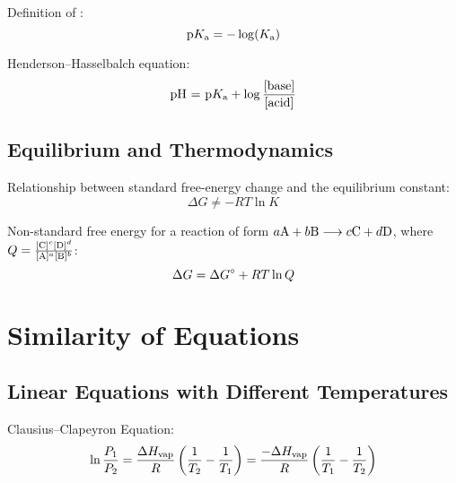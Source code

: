 \documentclass[10pt]{article}
\begin{document}
Definition of \pKa:
\begin{equation*}
\textnormal{\pKa} = -\log(\textnormal{\Ka})
\end{equation*}

Henderson--Hasselbalch equation:
\begin{equation*}
\textnormal{pH = \pKa} + \log \frac{\textnormal{[base]}}{\textnormal{[acid]}}
\end{equation*}


\subsection{Equilibrium and Thermodynamics}

Relationship between standard free-energy change and the equilibrium constant:
\begin{equation*}
\Delta G\not = -RT \ln K
\end{equation*}

Non-standard free energy for a reaction of form $a\textnormal{A}+b\textnormal{B} \longrightarrow c\textnormal{C}+d\textnormal{D}$, where $Q = \frac{[\textnormal{C}]^c[\textnormal{D}]^d}{[\textnormal{A}]^a[\textnormal{B}]^b}$:
\begin{equation*}
\Delta G = \Delta G\not + RT\ln Q
\end{equation*}


\section{Similarity of Equations}

\subsection{Linear Equations with Different Temperatures}

Clausius--Clapeyron Equation:
\begin{equation*}
\ln \frac{P_1}{P_2} = \frac{\Delta H_\textnormal{vap}}{R}\left(\frac{1}{T_2} - \frac{1}{T_1}\right) = \frac{-\Delta H_\textnormal{vap}}{R}\left(\frac{1}{T_1} - \frac{1}{T_2}\right)
\end{equation*}
\end{document}
